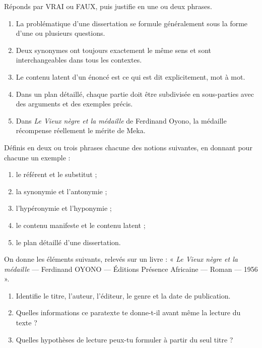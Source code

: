 \documentclass[11pt]{article}
\newcommand{\cle}[1]{{\popxbold\color{popdark}#1}}
\begin{document}
\begin{exercice}
Réponds par VRAI ou FAUX, puis justifie en une ou deux phrases.
\begin{enumerate}
\item La problématique d'une dissertation se formule généralement sous la forme d'une ou plusieurs questions.
\item Deux synonymes ont toujours exactement le même sens et sont interchangeables dans tous les contextes.
\item Le contenu latent d'un énoncé est ce qui est dit explicitement, mot à mot.
\item Dans un plan détaillé, chaque partie doit être subdivisée en sous-parties avec des arguments et des exemples précis.
\item Dans \emph{Le Vieux nègre et la médaille} de Ferdinand Oyono, la médaille récompense réellement le mérite de Meka.
\end{enumerate}
\end{exercice}

\begin{exercice}[Définitions]
Définis en deux ou trois phrases chacune des notions suivantes, en donnant pour chacune un exemple :
\begin{enumerate}
\item le \cle{référent} et le \cle{substitut} ;
\item la \cle{synonymie} et l'\cle{antonymie} ;
\item l'\cle{hypéronymie} et l'\cle{hyponymie} ;
\item le \cle{contenu manifeste} et le \cle{contenu latent} ;
\item le \cle{plan détaillé} d'une dissertation.
\end{enumerate}
\end{exercice}

\begin{exercice}
On donne les éléments suivants, relevés sur un livre : « \emph{Le Vieux nègre et la médaille} — Ferdinand OYONO — Éditions Présence Africaine — Roman — 1956 ».
\begin{enumerate}
\item Identifie le titre, l'auteur, l'éditeur, le genre et la date de publication.
\item Quelles informations ce paratexte te donne-t-il avant même la lecture du texte ?
\item Quelles hypothèses de lecture peux-tu formuler à partir du seul titre ?
\end{enumerate}
\end{exercice}
\end{document}
